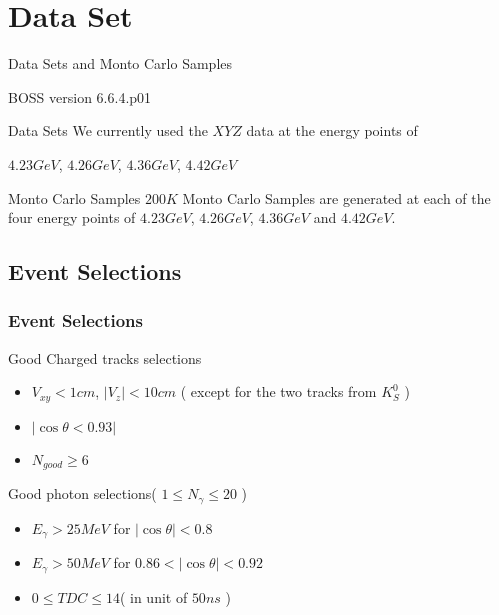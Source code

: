 \documentclass{beamer}
\begin{document}
\section{Data Set}
\begin{frame}{Data Sets and Monto Carlo Samples}
    \begin{block}{BOSS version}
        6.6.4.p01
    \end{block}
    \begin{block}{Data Sets}
        We currently used the $XYZ$ data at the energy points of\\
        \begin{center}
            $4.23 GeV$, $4.26 GeV$, $4.36 GeV$, $4.42 GeV$\\
        \end{center}
    \end{block}
    \begin{block}{Monto Carlo Samples}
        $200 K$ Monto Carlo Samples are generated at each of the four energy points of $4.23 GeV$, $4.26 GeV$, $4.36 GeV$ and $4.42 GeV$.
    \end{block}
\end{frame}
\subsection{Event Selections}
\begin{frame}
    \frametitle{Event Selections}
    \begin{block}{Good Charged tracks selections}
        \begin{itemize}
            \item $V_{xy} < 1 cm$, $ | V_z | < 10 cm$ ( except for the two tracks from $K_S^0$ )
            \item $|\cos\theta < 0.93 |$
            \item $N_{good}\geq 6$
        \end{itemize}
    \end{block}
    \begin{block}{Good photon selections( $1\leq N_{\gamma}\leq 20$ )}
        \begin{itemize}
            \item $E_{\gamma} > 25 MeV$ for $|\cos\theta| < 0.8$
            \item $E_{\gamma} > 50 MeV$ for $0.86<|\cos\theta|<0.92$
            \item $0\leq TDC\leq 14 $( in unit of $50ns$ )
        \end{itemize}
    \end{block}
    \bigskip
\end{frame}
\end{document}
